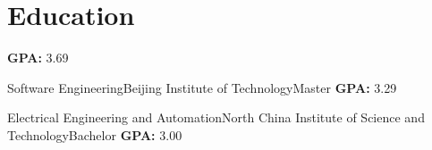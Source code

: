 

\section{Education}

%
{\textbf{GPA:} 3.69
}

{Software Engineering}{Beijing Institute of Technology}{Master}{}
{\textbf{GPA:} 3.29
}

{Electrical Engineering and Automation}{North China Institute of Science and Technology}{Bachelor}{}
{\textbf{GPA:} 3.00
}
